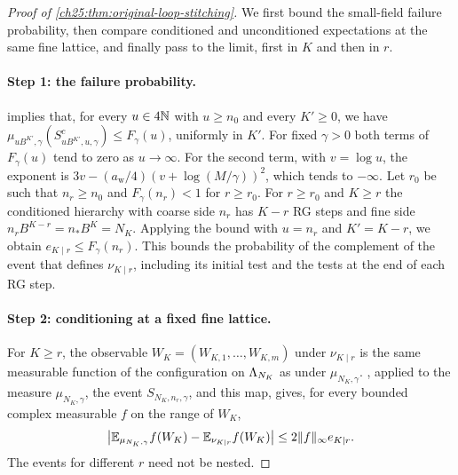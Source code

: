 \begin{proof}[Proof of \cref{ch25:thm:original-loop-stitching}]
We first bound the small-field failure probability, then compare conditioned and unconditioned expectations at the same fine lattice, and finally pass to the limit, first in $K$ and then in $r$.

\paragraph{Step 1: the failure probability.}
 implies that, for every $u\in4\mathbb N$ with $u\ge n_0$ and every $K'\ge0$, we have $\mu_{uB^{K'},\gamma}(S_{uB^{K'},u,\gamma}^c)\le F_\gamma(u)$, uniformly in $K'$. For fixed $\gamma>0$ both terms of $F_\gamma(u)$ tend to zero as $u\to\infty$. For the second term, with $v=\log u$, the exponent is $3v-(a_{\mathrm w}/4)(v+\log(M/\gamma))^2$, which tends to $-\infty$. Let $r_0$ be such that $n_r\ge n_0$ and $F_\gamma(n_r)<1$ for $r\ge r_0$. For $r\ge r_0$ and $K\ge r$ the conditioned hierarchy with coarse side $n_r$ has $K-r$ RG steps and fine side $n_rB^{K-r}=n_*B^K=N_K$. Applying the bound with $u=n_r$ and $K'=K-r$, we obtain $e_{K\mid r}\le F_\gamma(n_r)$. This bounds the probability of the complement of the event that defines $\nu_{K\mid r}$, including its initial test and the tests at the end of each RG step.

\paragraph{Step 2: conditioning at a fixed fine lattice.}
For $K\ge r$, the observable $W_K=(W_{K,1},\ldots,W_{K,m})$ under $\nu_{K\mid r}$ is the same measurable function of the configuration on $\Lambda_{N_K}$ as under $\mu_{N_K,\gamma}$. , applied to the measure $\mu_{N_K,\gamma}$, the event $S_{N_K,n_r,\gamma}$, and this map, gives, for every bounded complex measurable $f$ on the range of $W_K$,
\begin{equation}\label{ch25:eq:same-cutoff-transfer}
 \bigl\lvert\mathbb E_{\mu_{N_K,\gamma}}f(W_K)-\mathbb E_{\nu_{K\mid r}}f(W_K)\bigr\rvert\le2\lVert f\rVert_\infty e_{K\mid r}.
\end{equation}
The events for different $r$ need not be nested.


\end{proof}
